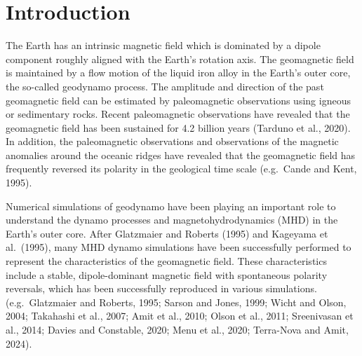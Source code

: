 \newpage
\section{Introduction}
\label{section:introduction}
The Earth has an intrinsic magnetic field which is dominated by a dipole component roughly aligned with the Earth's rotation axis. 
{\color{teal}
The geomagnetic field is maintained by a flow motion of the liquid iron alloy in the Earth's outer core, the so-called geodynamo process.
}
The amplitude and direction of the past geomagnetic field can be estimated by paleomagnetic observations using igneous or sedimentary rocks. Recent paleomagnetic observations have revealed that the geomagnetic field has been sustained for 4.2 billion years (Tarduno et al., 2020). %
In addition, the paleomagnetic observations and observations of the magnetic anomalies around the oceanic ridges have revealed that 
{\color{teal}
the geomagnetic field has frequently reversed its polarity in the geological time scale (e.g.\ Cande and Kent, 1995).
}

Numerical simulations of geodynamo have been playing an important role to understand the dynamo processes and magnetohydrodynamics (MHD) in the Earth's outer core.
After Glatzmaier and Roberts (1995) %
and Kageyama et al.\ (1995), %
many MHD dynamo simulations have been successfully performed to represent the characteristics of the geomagnetic field. 
{\color{magenta}
These characteristics include a stable, dipole-dominant magnetic field with spontaneous polarity reversals, which has been successfully reproduced in various simulations. (e.g.\ Glatzmaier and Roberts, 1995; 
}
Sarson and Jones, 1999;
{\color{teal}
Wicht and Olson, 2004;
}
Takahashi et al., 2007; 
{\color{red}
Amit et al., 2010; 
}
Olson et al., 2011; 
Sreenivasan et al., 2014;
{\color{red}
Davies and Constable, 2020;
Menu et al., 2020;
Terra-Nova and Amit, 2024).
}


